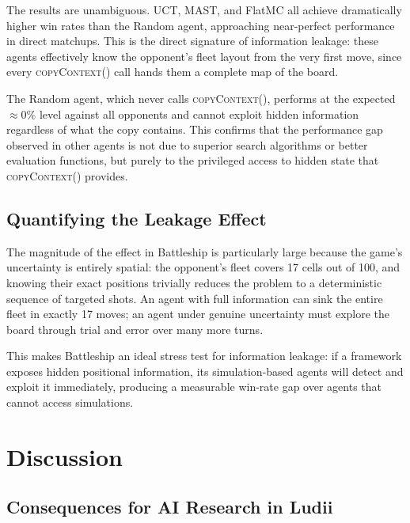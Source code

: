 
The results are unambiguous. UCT, MAST, and FlatMC all achieve dramatically higher win rates than the Random agent, approaching near-perfect performance in direct matchups. This is the direct signature of information leakage: these agents effectively know the opponent's fleet layout from the very first move, since every \textsc{copyContext()} call hands them a complete map of the board.

The Random agent, which never calls \textsc{copyContext()}, performs at the expected $\approx 0\%$ level against all opponents and cannot exploit hidden information regardless of what the copy contains. This confirms that the performance gap observed in other agents is not due to superior search algorithms or better evaluation functions, but purely to the privileged access to hidden state that \textsc{copyContext()} provides.

\subsection{Quantifying the Leakage Effect}

The magnitude of the effect in Battleship is particularly large because the game's uncertainty is entirely spatial: the opponent's fleet covers 17 cells out of 100, and knowing their exact positions trivially reduces the problem to a deterministic sequence of targeted shots. An agent with full information can sink the entire fleet in exactly 17 moves; an agent under genuine uncertainty must explore the board through trial and error over many more turns.

This makes Battleship an ideal stress test for information leakage: if a framework exposes hidden positional information, its simulation-based agents will detect and exploit it immediately, producing a measurable win-rate gap over agents that cannot access simulations.


\section{Discussion}
\label{sec:ludii_discussion}

\subsection{Consequences for AI Research in Ludii}

